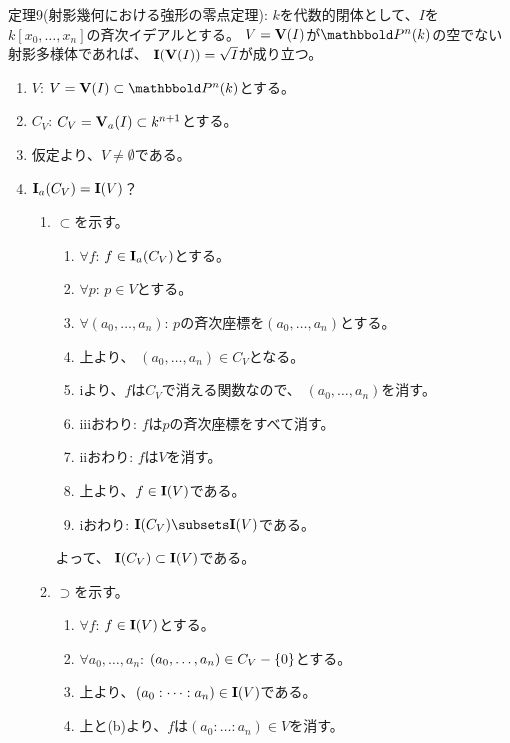 \begin{framed}
  定理9(射影幾何における強形の零点定理):
  $k$を代数的閉体として、$I$を$k[x_0,\dots,x_n]$の斉次イデアルとする。
  $V=\textbf V(I)$が$\P^n(k)$の空でない射影多様体であれば、
  $\textbf I(\textbf V(I)) = \sqrt{I}$が成り立つ。
\end{framed}
\begin{myproof}
  \begin{enumerate}
    \item $V$:
    $V=\var(I) \subset \P^n(k)$とする。
    \item $C_V$:
    $C_V = \textbf V_a(I) \subset k^{n+1}$とする。
    \item
    仮定より、$V\neq \emptyset$である。
    \item $\textbf I_a(C_V) = \textbf I(V)$？
    \begin{enumerate}
      \item $\subset$を示す。
      \begin{enumerate}
        \item $\forall f$: $f\in \textbf I_a(C_V)$とする。
        \item
        $\forall p$: $p\in V$とする。
        \item
        $\forall (a_0,\dots,a_n)$: $p$の斉次座標を$(a_0,\dots,a_n)$とする。
        \item 上より、
        $(a_0,\dots,a_n)\in C_V$となる。
        \item
        iより、$f$は$C_V$で消える関数なので、
        $(a_0,\dots,a_n)$を消す。
        \item
        iiiおわり:
        $f$は$p$の斉次座標をすべて消す。
        \item
        iiおわり: $f$は$V$を消す。
        \item
        上より、$f\in \textbf I(V)$である。
        \item
        iおわり: $\ideal(C_V)\subsets \ideal(V)$である。
      \end{enumerate}
      よって、 $\textbf I(C_V)\subset \textbf I(V)$である。
      \item $\supset$を示す。
      \begin{enumerate}
        \item $\forall f$: $f\in \textbf I(V)$とする。
        \item
        $\forall a_0,\dots,a_n$: $(a_0,\dots,a_n) \in C_V-\{0\}$とする。
        \item
        上より、$(a_0:\dots:a_n) \in \textbf I(V)$である。
        \item
        上と(b)より、$f$は$(a_0:\dots:a_n) \in V$を消す。

\end{enumerate}
\end{enumerate}
\end{enumerate}
\end{myproof}
